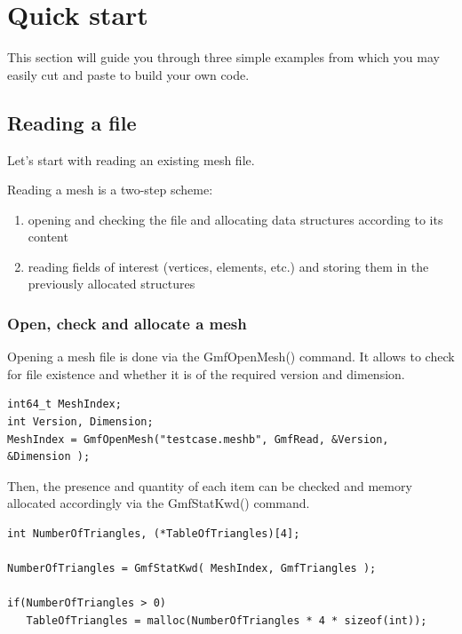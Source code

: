 \documentclass[a4paper,12pt]{article}
\begin{document}
%
%

\section{Quick start}

This section will guide you through three simple examples from which you may easily cut and paste to build your own code.

\subsection{Reading a file}

Let's start with reading an existing mesh file.

Reading a mesh is a two-step scheme:

\begin{enumerate}
\item opening and checking the file and allocating data structures according to its content
\item reading fields of interest (vertices, elements, etc.) and storing them in the previously allocated structures
\end{enumerate}

\subsubsection{Open, check and allocate a mesh}

Opening a mesh file is done via the GmfOpenMesh() command. It allows to check for file existence and whether it is of the required version and dimension.

\begin{tt}
\begin{verbatim}
int64_t MeshIndex;
int Version, Dimension;
MeshIndex = GmfOpenMesh("testcase.meshb", GmfRead, &Version, &Dimension );
\end{verbatim}
\end{tt}
\normalfont

Then, the presence and quantity of each item can be checked and memory allocated accordingly via the GmfStatKwd() command.

\begin{tt}
\begin{verbatim}
int NumberOfTriangles, (*TableOfTriangles)[4];

NumberOfTriangles = GmfStatKwd( MeshIndex, GmfTriangles );

if(NumberOfTriangles > 0)
   TableOfTriangles = malloc(NumberOfTriangles * 4 * sizeof(int));
\end{verbatim}
\end{tt}
\normalfont
\end{document}
